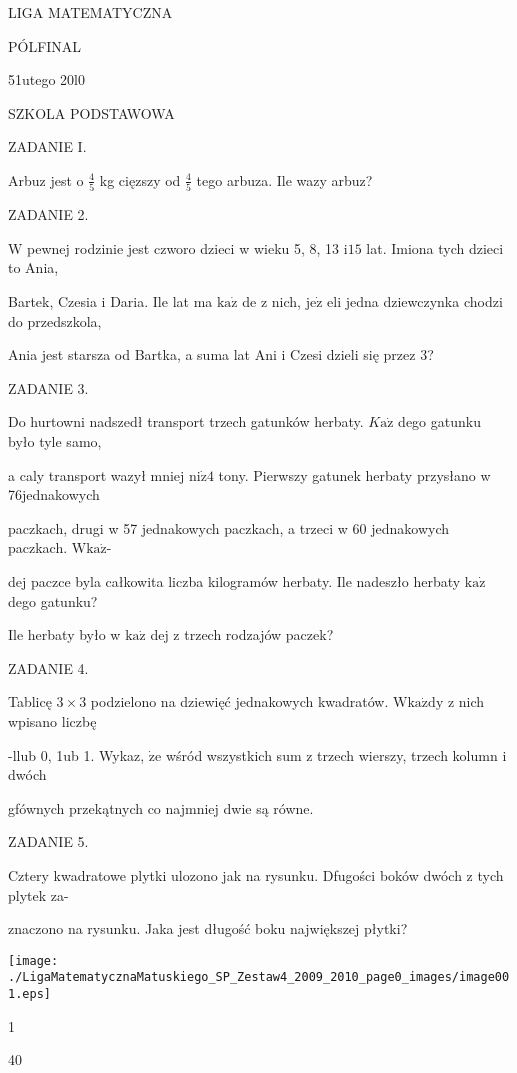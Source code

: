 \documentclass[a4paper,12pt]{article}
\begin{document}
LIGA MATEMATYCZNA

PÓLFINAL

51utego 20l0

SZKOLA PODSTAWOWA

ZADANIE I.

Arbuz jest o $\displaystyle \frac{4}{5}$ kg cięzszy od $\displaystyle \frac{4}{5}$ tego arbuza. Ile wazy arbuz?

ZADANIE 2.

$\mathrm{W}$ pewnej rodzinie jest czworo dzieci w wieku 5, 8, 13 $\mathrm{i} 15$ lat. Imiona tych dzieci to Ania,

Bartek, Czesia i Daria. Ile lat ma $\mathrm{k}\mathrm{a}\dot{\mathrm{z}}$ de z nich, $\mathrm{j}\mathrm{e}\dot{\mathrm{z}}$ eli jedna dziewczynka chodzi do przedszkola,

Ania jest starsza od Bartka, a suma lat Ani i Czesi dzieli się przez 3?

ZADANIE 3.

Do hurtowni nadszedł transport trzech gatunków herbaty. $K\mathrm{a}\dot{\mathrm{z}}$ dego gatunku było tyle samo,

a caly transport wazył mniej $\mathrm{n}\mathrm{i}\dot{\mathrm{z}}4$ tony. Pierwszy gatunek herbaty przysłano w 76jednakowych

paczkach, drugi w 57 jednakowych paczkach, a trzeci w 60 jednakowych paczkach. $\mathrm{W}\mathrm{k}\mathrm{a}\dot{\mathrm{z}}$-

dej paczce byla całkowita liczba kilogramów herbaty. Ile nadeszło herbaty $\mathrm{k}\mathrm{a}\dot{\mathrm{z}}$ dego gatunku?

Ile herbaty było w $\mathrm{k}\mathrm{a}\dot{\mathrm{z}}$ dej z trzech rodzajów paczek?

ZADANIE 4.

Tablicę $3\times 3$ podzielono na dziewięć jednakowych kwadratów. $\mathrm{W}\mathrm{k}\mathrm{a}\dot{\mathrm{z}}\mathrm{d}\mathrm{y}$ z nich wpisano liczbę

-llub 0, 1ub 1. Wykaz, $\dot{\mathrm{z}}\mathrm{e}$ wśród wszystkich sum z trzech wierszy, trzech kolumn i dwóch

gfównych przekątnych co najmniej dwie są równe.

ZADANIE 5.

Cztery kwadratowe plytki ulozono jak na rysunku. Dfugości boków dwóch z tych plytek za-

znaczono na rysunku. Jaka jest długość boku największej płytki?
\begin{center}
\texttt{[image: ./LigaMatematycznaMatuskiego\_SP\_Zestaw4\_2009\_2010\_page0\_images/image001.eps]}
\end{center}
1

40
\end{document}
